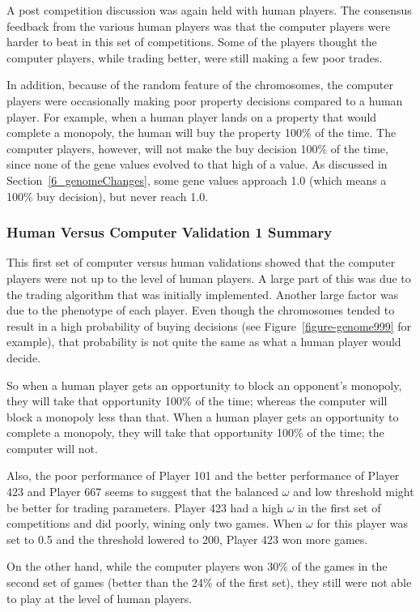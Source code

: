A post competition discussion was again held with human players. The consensus
feedback from the various human players was that the computer players were
harder to beat in this set of competitions. Some of the players thought the
computer players, while trading better, were still making a few poor trades.

In addition, because of the random feature of the chromosomes, the computer
players were occasionally making poor property decisions compared to a human
player. For example, when a human player lands on a property that would complete
a monopoly, the human will buy the property 100\% of the time. The computer
players, however, will not make the buy decision 100\% of the time, since none
of the gene values evolved to that high of a value. As discussed in
Section~\ref{6_genomeChanges}, some gene values approach 1.0 (which means a
100\% buy decision), but never reach 1.0.

\subsubsection{Human Versus Computer Validation 1 Summary}

This first set of computer versus human validations showed that the computer
players were not up to the level of human players. A large part of
this was due to the trading algorithm that was initially implemented. Another
large factor was due to the phenotype of each player. Even though the
chromosomes tended to result in a high probability of buying decisions (see
Figure~\ref{figure-genome999} for example), that probability is not quite the
same as what a human player would decide. 

So when a human player gets an opportunity to block an opponent's monopoly, they
will take that opportunity 100\% of the time; whereas the computer will block a
monopoly less than that. When a human player gets an opportunity to complete a
monopoly, they will take that opportunity 100\% of the time; the computer will
not.

Also, the poor performance of Player 101 and the better performance of Player
423 and Player 667 seems to suggest that the balanced \(\omega\) and low 
threshold might be better for trading parameters. Player 423 had a high 
\(\omega\) in the first set of competitions and did poorly, wining only two 
games. When \(\omega\) for this player was set to 0.5 and the threshold lowered
to 200, Player 423 won more games. 

On the other hand, while the computer players won 30\% of the games in the
second set of games (better than the 24\% of the first set), they still were not
able to play at the level of human players. 

